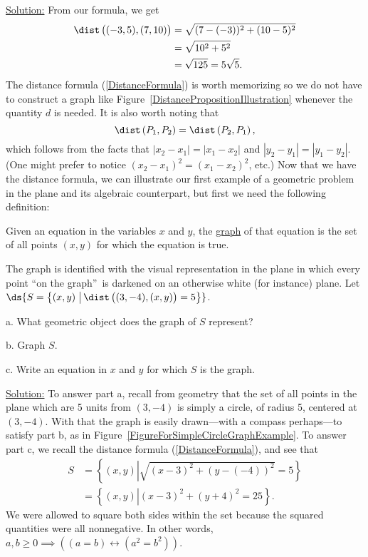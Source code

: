 \underline{Solution:} From our formula, we get
\begin{align*}
\dist\left(\vphantom{x_2^2}(-3,5),(7,10)\right)
&=\sqrt{(7-(-3))^2+(10-5)^2}\\
&=\sqrt{10^2+5^2}\\
&=\sqrt{125}
=5\sqrt5.\end{align*} 
\eex
The distance formula (\ref{DistanceFormula}) is worth memorizing
so we do not have to construct a graph like 
Figure~\ref{DistancePropositionIllustration}
whenever the quantity $d$ is needed. 
It is also worth noting that
\begin{equation}
\dist\left(P_1,P_2\right)=\dist\left(P_2,P_1\right),
\label{SymmetryOfDistanceFormula}\end{equation}
which follows from the facts that
$\left|x_2-x_1\right|=\left|x_1-x_2\right|$ and
$\left|y_2-y_1\right|=\left|y_1-y_2\right|$.
(One might prefer to notice $(x_2-x_1)^2=(x_1-x_2)^2$, etc.)
Now that we have the distance formula, we can illustrate
our first example of a geometric problem in the plane and its algebraic
counterpart, but first we need the following definition:
\begin{definition} Given an equation in the variables $x$ and $y$,
the \underline{graph} 
of that equation is the set of all points $(x,y)$ for which
the equation is true.\end{definition}
The graph is identified with the visual  representation
in the plane in
which every point ``on the graph''\footnotemark\  is darkened
on an otherwise white (for instance) plane.
\bex Let $\ds{S=\left\{(x,y)\left.\vphantom{x_2^2}\right|
\dist\left(\vphantom{x_2^2}(3,-4),(x,y)\right)=5\right\}}$.
\begin{description}
\item a. What geometric object does the graph of $S$ 
represent?
\item b. Graph $S$.
\item c. Write an equation in $x$ and $y$ for which
$S$ is the graph.
\end{description} 

\underline{Solution:} To answer part a, recall from geometry that the set
of all points in the plane  which are 5 units from $(3,-4)$ is simply
a circle, of radius 5, centered at $(3,-4)$.  With 
that the graph is easily drawn---with a compass perhaps---to
satisfy part b, as in Figure~\ref{FigureForSimpleCircleGraphExample}.
 To answer part c, we recall the distance formula
(\ref{DistanceFormula}), and see that
\begin{align*}
S&=\left\{(x,y)\left|\sqrt{(x-3)^2+(y-(-4))^2}=5\right.\right\}\\
&=\left\{(x,y)\left|(x-3)^2+(y+4)^2=25\right.\right\}.
\end{align*}  
We were allowed to square both sides within the set 
because the squared quantities were all nonnegative.
In other words, $a,b\ge0\implies\left((a=b)\longleftrightarrow(a^2=b^2)
\right)$.

